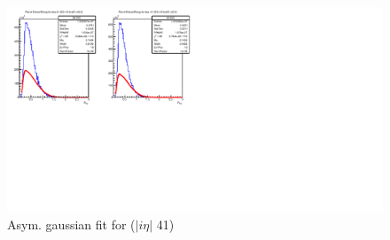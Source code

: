 \begin{figure}[h]
\centering
\includegraphics[width=\linewidth]{../Figures/Chap2/ImageFiles_HF/Ratio/Ratioieta41.pdf}
\caption{Asym. gaussian fit for \ratiosl ($|i\eta|$ 41)}
\label{fig:Ratioieta41}
\end{figure}


